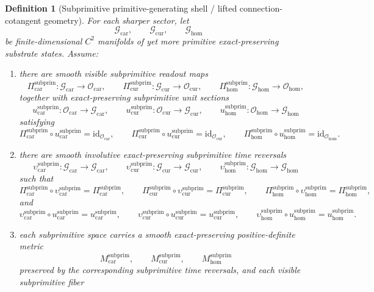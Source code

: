 \documentclass[11pt]{article}
\newcommand{\TensorObjClass}{\mathcal O_{\mathrm{car}}}
\newcommand{\CurObjClass}{\mathcal O_{\mathrm{cur}}}
\newcommand{\HomObjClass}{\mathcal O_{\mathrm{hom}}}
\newcommand{\TensorSubprimitiveSpace}{\mathcal G_{\mathrm{car}}}
\newcommand{\CurSubprimitiveSpace}{\mathcal G_{\mathrm{cur}}}
\newcommand{\HomSubprimitiveSpace}{\mathcal G_{\mathrm{hom}}}
\newcommand{\TensorSubprimitiveRead}{\Pi_{\mathrm{car}}^{\mathrm{subprim}}}
\newcommand{\CurSubprimitiveRead}{\Pi_{\mathrm{cur}}^{\mathrm{subprim}}}
\newcommand{\HomSubprimitiveRead}{\Pi_{\mathrm{hom}}^{\mathrm{subprim}}}
\newcommand{\TensorSubprimitiveUnit}{u_{\mathrm{car}}^{\mathrm{subprim}}}
\newcommand{\CurSubprimitiveUnit}{u_{\mathrm{cur}}^{\mathrm{subprim}}}
\newcommand{\HomSubprimitiveUnit}{u_{\mathrm{hom}}^{\mathrm{subprim}}}
\newcommand{\TensorSubprimitiveTimeRev}{\upsilon_{\mathrm{car}}^{\mathrm{subprim}}}
\newcommand{\CurSubprimitiveTimeRev}{\upsilon_{\mathrm{cur}}^{\mathrm{subprim}}}
\newcommand{\HomSubprimitiveTimeRev}{\upsilon_{\mathrm{hom}}^{\mathrm{subprim}}}
\newcommand{\TensorSubprimitiveSpaceMetric}{M_{\mathrm{car}}^{\mathrm{subprim}}}
\newcommand{\CurSubprimitiveSpaceMetric}{M_{\mathrm{cur}}^{\mathrm{subprim}}}
\newcommand{\HomSubprimitiveSpaceMetric}{M_{\mathrm{hom}}^{\mathrm{subprim}}}
\newtheorem{definition}{Definition}
\begin{document}
\begin{definition}[Subprimitive primitive-generating shell / lifted connection-cotangent geometry]
\label{def:subprimitive_geometry}
For each sharper sector, let
\[
\TensorSubprimitiveSpace,\qquad
\CurSubprimitiveSpace,\qquad
\HomSubprimitiveSpace
\]
be finite-dimensional \(C^2\) manifolds of yet more primitive exact-preserving substrate states. Assume:
\begin{enumerate}
    \item there are smooth visible subprimitive readout maps
    \[
    \TensorSubprimitiveRead:\TensorSubprimitiveSpace\to\TensorObjClass,\qquad
    \CurSubprimitiveRead:\CurSubprimitiveSpace\to\CurObjClass,\qquad
    \HomSubprimitiveRead:\HomSubprimitiveSpace\to\HomObjClass,
    \]
    together with exact-preserving subprimitive unit sections
    \[
    \TensorSubprimitiveUnit:\TensorObjClass\to\TensorSubprimitiveSpace,\qquad
    \CurSubprimitiveUnit:\CurObjClass\to\CurSubprimitiveSpace,\qquad
    \HomSubprimitiveUnit:\HomObjClass\to\HomSubprimitiveSpace
    \]
    satisfying
    \[
    \TensorSubprimitiveRead\circ\TensorSubprimitiveUnit=\mathrm{id}_{\TensorObjClass},\qquad
    \CurSubprimitiveRead\circ\CurSubprimitiveUnit=\mathrm{id}_{\CurObjClass},\qquad
    \HomSubprimitiveRead\circ\HomSubprimitiveUnit=\mathrm{id}_{\HomObjClass}.
    \]
    \item there are smooth involutive exact-preserving subprimitive time reversals
    \[
    \TensorSubprimitiveTimeRev:\TensorSubprimitiveSpace\to\TensorSubprimitiveSpace,\qquad
    \CurSubprimitiveTimeRev:\CurSubprimitiveSpace\to\CurSubprimitiveSpace,\qquad
    \HomSubprimitiveTimeRev:\HomSubprimitiveSpace\to\HomSubprimitiveSpace
    \]
    such that
    \[
    \TensorSubprimitiveRead\circ\TensorSubprimitiveTimeRev=\TensorSubprimitiveRead,\qquad
    \CurSubprimitiveRead\circ\CurSubprimitiveTimeRev=\CurSubprimitiveRead,\qquad
    \HomSubprimitiveRead\circ\HomSubprimitiveTimeRev=\HomSubprimitiveRead,
    \]
    and
    \[
    \TensorSubprimitiveTimeRev\circ\TensorSubprimitiveUnit=\TensorSubprimitiveUnit,\qquad
    \CurSubprimitiveTimeRev\circ\CurSubprimitiveUnit=\CurSubprimitiveUnit,\qquad
    \HomSubprimitiveTimeRev\circ\HomSubprimitiveUnit=\HomSubprimitiveUnit.
    \]
    \item each subprimitive space carries a smooth exact-preserving positive-definite metric
    \[
    \TensorSubprimitiveSpaceMetric,\qquad
    \CurSubprimitiveSpaceMetric,\qquad
    \HomSubprimitiveSpaceMetric
    \]
    preserved by the corresponding subprimitive time reversals, and each visible subprimitive fiber

\end{enumerate}
\end{definition}
\end{document}
